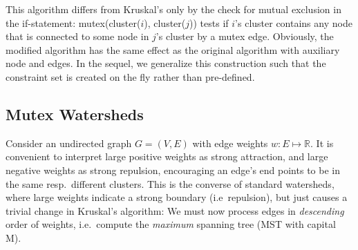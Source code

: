 \noindent This algorithm differs from Kruskal's only by the check for mutual exclusion in the if-statement: mutex(cluster($i$), cluster($j$)) tests if $i$'s cluster contains any node that is connected to some node in $j$'s cluster by a mutex edge. Obviously, the modified algorithm has the same effect as the original algorithm with auxiliary node and edges. In the sequel, we generalize this construction such that the constraint set is created on the fly rather than pre-defined.




%
%
%

\subsection{Mutex Watersheds}

\noindent Consider an undirected graph $G=(V, E)$ with edge weights $w: E \mapsto \mathbb{R}$. It is convenient to interpret large positive weights as strong attraction, and large negative weights as strong repulsion, encouraging an edge's end points to be in the same resp.\ different clusters. This is the converse of standard watersheds, where large weights indicate a strong boundary (i.e\ repulsion), but just causes a trivial change in Kruskal's algorithm: We must now process edges in {\em descending} order of weights, i.e.\ compute the {\em maximum} spanning tree (MST with capital M). 

